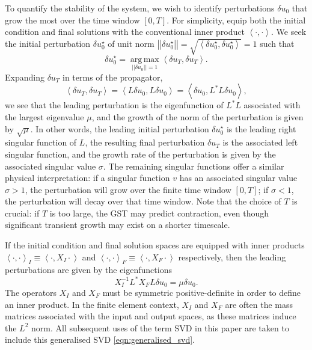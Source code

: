 \documentclass{siamltex}
\begin{document}
To quantify the stability of the system, we wish to identify perturbations $\delta u_0$ that grow the most over the time window $[0, T]$.
For simplicity, equip both the initial condition and final solutions with the conventional inner product $\left\langle \cdot, \cdot \right\rangle$.
We seek the initial perturbation $\delta u^{\star}_0$ of unit norm $\left|\left|\delta u^{\star}_0\right|\right| = \sqrt{\left\langle \delta u^{\star}_0, \delta u^{\star}_0 \right\rangle} = 1$
such that
\begin{equation}
  \delta u^{\star}_0 = \operatorname*{arg\,max}_{\left|\left|\delta u_0\right|\right| = 1} \left\langle \delta u_T, \delta u_T \right\rangle.
\end{equation}
Expanding $\delta u_T$ in terms of the propagator,
\begin{equation}
\left\langle \delta u_T, \delta u_T \right\rangle = \left\langle L \delta u_0, L \delta u_0 \right\rangle = \left\langle \delta u_0, L^*L \delta u_0 \right\rangle,
\end{equation}
we see that the leading perturbation is the eigenfunction of $L^*L$ associated with the largest eigenvalue $\mu$, and the growth of the norm of the perturbation is given
by $\sqrt{\mu}$. In other words, the leading initial perturbation $\delta u^{\star}_0$ is the leading right singular function of $L$, the resulting final perturbation $\delta u_T$
is the associated left singular function, and the growth rate of the perturbation is given by the associated singular value $\sigma$. The remaining singular functions
offer a similar physical interpretation: if a singular function $v$ has an associated singular value $\sigma > 1$, the perturbation will grow over the finite time window $[0, T]$; if $\sigma < 1$,
the perturbation will decay over that time window. Note that the choice of $T$ is crucial: if $T$ is too large, the GST may predict contraction, even though significant transient growth may exist on
a shorter timescale.

If the initial condition and final solution spaces are equipped with inner products $\left\langle \cdot, \cdot \right\rangle_I \equiv \left\langle \cdot, X_I \cdot \right\rangle$ and
$\left\langle \cdot, \cdot \right\rangle_F \equiv \left\langle \cdot, X_F \cdot \right\rangle$ respectively, then the leading perturbations are given by the eigenfunctions
\begin{equation} \label{eqn:generalised_svd}
X_I^{-1} L^* X_F L \delta u_0 = \mu \delta u_0.
\end{equation}
The operators $X_I$ and $X_F$ must be symmetric positive-definite in order to define an inner
product. In the finite element context, $X_I$ and $X_F$ are often the mass matrices associated with
the input and output spaces, as these matrices induce the $L^2$ norm. All subsequent uses
of the term SVD in this paper are taken to include this generalised SVD \eqref{eqn:generalised_svd}.
\end{document}
